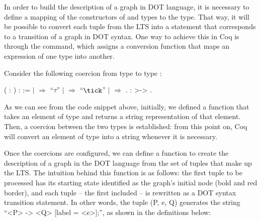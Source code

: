 In order to build the description of a graph in DOT language, it is necessary to define a mapping of the constructors of  and  types to the  type. That way, it will be possible to convert each tuple from the LTS into a statement that corresponds to a transition of a graph in DOT syntax. One way to achieve this in Coq is through the  command, which assigns a conversion function that maps an expression of one type into another.

Consider the following coercion from type  to type :

\begin{coqdoccode}
	\coqdocnoindent
	  ( : ) :  :=\coqdoceol
	\coqdocindent{1.00em}
	  \coqdoceol
	\coqdocindent{1.00em}
	\ensuremath{|}  \ensuremath{\Rightarrow} ``$ \tau $''\coqdoceol
	\coqdocindent{1.00em}
	\ensuremath{|}  \ensuremath{\Rightarrow} ``$ \tick $''\coqdoceol
	\coqdocindent{1.00em}
	\ensuremath{|}   \ensuremath{\Rightarrow} \coqdoceol
	\coqdocindent{1.00em}
	.\coqdoceol
	\coqdocemptyline
	\coqdocnoindent
	  :  >-> .\coqdoceol
\end{coqdoccode}

As we can see from the code snippet above, initially, we defined a function that takes an element of type  and returns a string representation of that element. Then, a coercion between the two types is established: from this point on, Coq will convert an element of type  into a string whenever it is necessary.

Once the coercions are configured, we can define a function to create the description of a graph in the DOT language from the set of tuples that make up the LTS. The intuition behind this function is as follows: the first tuple to be processed has its starting state identified as the graph's initial node (bold and red border), and each tuple -- the first included -- is rewritten as a DOT syntax transition statement. In other words, the tuple (P, e, Q) generates the string ``<P> -> <Q> [label = <e>];'', as shown in the definitions below:

